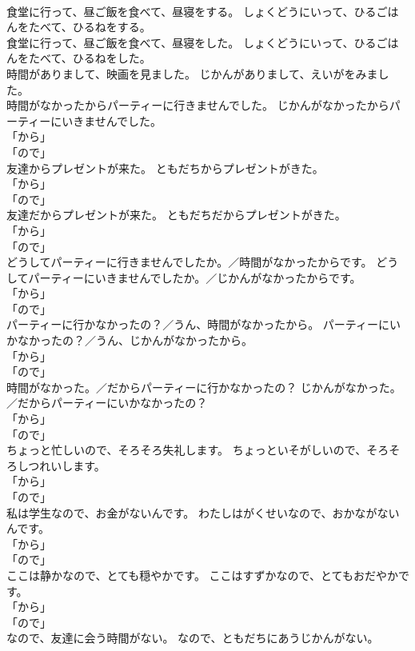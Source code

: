 \documentclass[8pt]{extreport}
\begin{document}
\begin{CJK}{UTF8}{min}
\\	食堂に行って、昼ご飯を食べて、昼寝をする。	しょくどうにいって、ひるごはんをたべて、ひるねをする。	
\\	食堂に行って、昼ご飯を食べて、昼寝をした。	しょくどうにいって、ひるごはんをたべて、ひるねをした。	
\\	時間がありまして、映画を見ました。	じかんがありまして、えいがをみました。	
\\	時間がなかったからパーティーに行きませんでした。	じかんがなかったからパーティーにいきませんでした。	
\\	「から」 
\\	「ので」	
\\	友達からプレゼントが来た。	ともだちからプレゼントがきた。	
\\	「から」 
\\	「ので」	
\\	友達だからプレゼントが来た。	ともだちだからプレゼントがきた。	
\\	「から」 
\\	「ので」	
\\	どうしてパーティーに行きませんでしたか。／時間がなかったからです。	どうしてパーティーにいきませんでしたか。／じかんがなかったからです。	
\\	「から」 
\\	「ので」	
\\	パーティーに行かなかったの？／うん、時間がなかったから。	パーティーにいかなかったの？／うん、じかんがなかったから。	
\\	「から」 
\\	「ので」	
\\	時間がなかった。／だからパーティーに行かなかったの？	じかんがなかった。／だからパーティーにいかなかったの？	
\\	「から」 
\\	「ので」	
\\	ちょっと忙しいので、そろそろ失礼します。	ちょっといそがしいので、そろそろしつれいします。	
\\	「から」 
\\	「ので」	
\\	私は学生なので、お金がないんです。	わたしはがくせいなので、おかながないんです。	
\\	「から」 
\\	「ので」	
\\	ここは静かなので、とても穏やかです。	ここはすずかなので、とてもおだやかです。	
\\	「から」 
\\	「ので」	
\\	なので、友達に会う時間がない。	なので、ともだちにあうじかんがない。	

\end{CJK}
\end{document}
